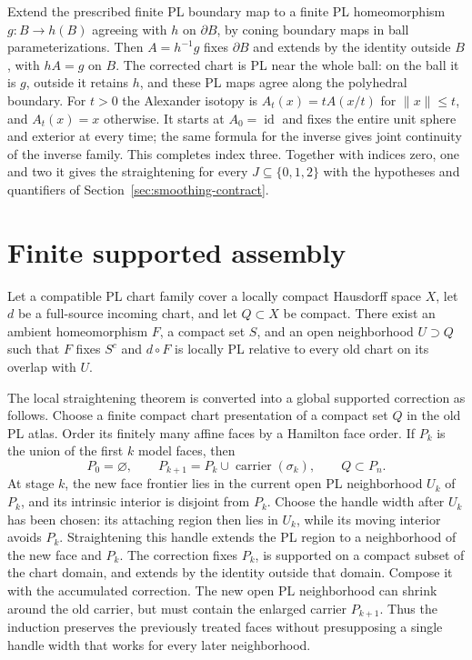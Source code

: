 Extend the prescribed finite PL boundary map to a finite PL homeomorphism
$g:B\to h(B)$ agreeing with $h$ on $\partial B$, by coning boundary maps
in ball parameterizations. Then $A=h^{-1}g$ fixes $\partial B$ and extends
by the identity outside $B$, with $hA=g$ on $B$. The corrected chart is
PL near the whole ball: on the ball it is $g$, outside it retains $h$,
and these PL maps agree along the polyhedral boundary. For $t>0$ the
Alexander isotopy is $A_t(x)=tA(x/t)$ for $\|x\|\leq t$, and $A_t(x)=x$
otherwise. It starts at $A_0=\operatorname{id}$ and fixes the entire unit
sphere and exterior at
every time; the same formula for the inverse gives joint continuity of
the inverse family. This completes index three. Together with indices
zero, one and two it gives the straightening for every
$J\subseteq\{0,1,2\}$ with the hypotheses and quantifiers of
Section~\ref{sec:smoothing-contract}.

\section{Finite supported assembly}
\label{sec:finite-assembly}

\begin{theorem}
\label{thm:smoothing-finite-assembly}
Let a compatible PL chart family cover a locally compact Hausdorff
space $X$, let $d$ be a full-source incoming chart, and let $Q\subset X$
be compact. There exist an ambient homeomorphism $F$, a compact set $S$,
and an open neighborhood $U\supset Q$ such that $F$ fixes $S^c$ and
$d\circ F$ is locally PL relative to every old chart on its overlap
with $U$.
\end{theorem}

The local straightening theorem is converted into a global supported
correction as follows.  Choose a finite compact chart presentation of a
compact set $Q$ in the old PL atlas.  Order its finitely many affine faces
by a Hamilton face order.  If $P_k$ is the union of the first $k$ model
faces, then
\[
 P_0=\varnothing,\qquad P_{k+1}=P_k\cup\operatorname{carrier}(\sigma_k),
 \qquad Q\subset P_n.
\]
At stage $k$, the new face frontier lies in the current open PL
neighborhood $U_k$ of $P_k$, and its intrinsic interior is disjoint from
$P_k$. Choose the handle width after $U_k$ has been chosen: its attaching
region then lies in $U_k$, while its moving interior avoids $P_k$.
Straightening this handle extends the PL region to a neighborhood of
the new face and $P_k$. The correction fixes $P_k$, is supported on a
compact subset of the chart domain, and extends by the identity outside
that domain. Compose it with the accumulated correction. The new open
PL neighborhood can shrink around the old carrier, but must contain
the enlarged carrier $P_{k+1}$. Thus the induction preserves the
previously treated faces without presupposing a single handle width
that works for every later neighborhood.

